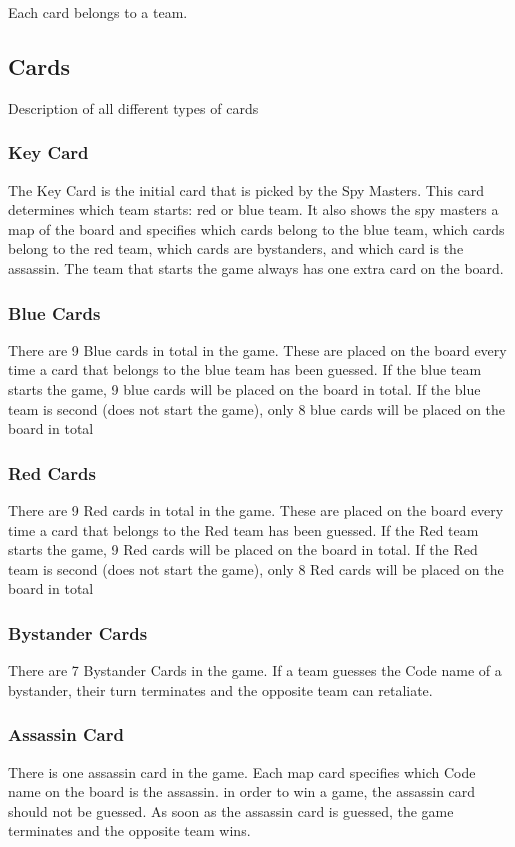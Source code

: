 \documentclass[12pt]{article}
\begin{document}
Each card belongs to a team. 

\newpage

\subsection{Cards}
Description of all different types of cards

\subsubsection{Key Card}
The Key Card is the initial card that is picked by the Spy Masters. This card determines which team starts: red or blue team. It also shows the spy masters a map of the board and specifies which cards belong to the blue team, which cards belong to the red team, which cards are bystanders, and which card is the assassin. The team that starts the game always has one extra card on the board.

\subsubsection{Blue Cards}
There are 9 Blue cards in total in the game. These are placed on the board every time a card that belongs to the blue team has been guessed. If the blue team starts the game, 9 blue cards will be placed on the board in total. If the blue team is second (does not start the game), only 8 blue cards will be placed on the board in total

\subsubsection{Red Cards}
There are 9 Red cards in total in the game. These are placed on the board every time a card that belongs to the Red team has been guessed. If the Red team starts the game, 9 Red cards will be placed on the board in total. If the Red team is second (does not start the game), only 8 Red cards will be placed on the board in total

\subsubsection{Bystander Cards}
There are 7 Bystander Cards in the game. If a team guesses the Code name of a bystander, their turn terminates and the opposite team can retaliate. 

\subsubsection{Assassin Card}
There is one assassin card in the game. Each map card specifies which Code name on the board is the assassin. in order to win a game, the assassin card should not be guessed. As soon as the assassin card is guessed, the game terminates and the opposite team wins.
\end{document}
